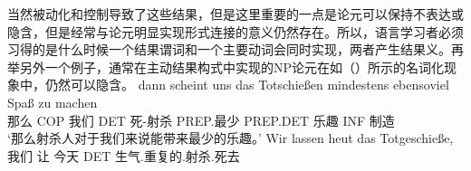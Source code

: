 \begin{exe}
\begin{xlist}[iv.]
\begin{exe}
\begin{xlist}[iv.]
\z
当然被动化和控制导致了这些结果，但是这里重要的一点是论元可以保持不表达或隐含，但是经常与论元明显实现形式连接的意义仍然存在\citep[Section~4]{Mueller2007d}。所以，语言学习者必须习得的是什么时候一个结果谓词和一个主要动词会同时实现，两者产生结果义。再举另外一个例子，通常在主动结果构式中实现的NP论元在如（）所示的名词化现象中，仍然可以隐含。
\eal
\label{ex-tot-schiessen}
\ex 
\gll dann scheint uns das Totschießen mindestens ebensoviel Spaß zu machen\footnotemark\\
     那么 COP   我们  DET 死-射杀 PREP.最少 PREP.DET    乐趣 INF 制造\\
\glt `那么射杀人对于我们来说能带来最少的乐趣。'
\ex
\gll Wir lassen heut das Totgeschieße,\\                   
我们  让    今天 DET 生气.重复的.射杀.死去\\

\end{xlist}
\end{exe}
\end{xlist}
\end{exe}
